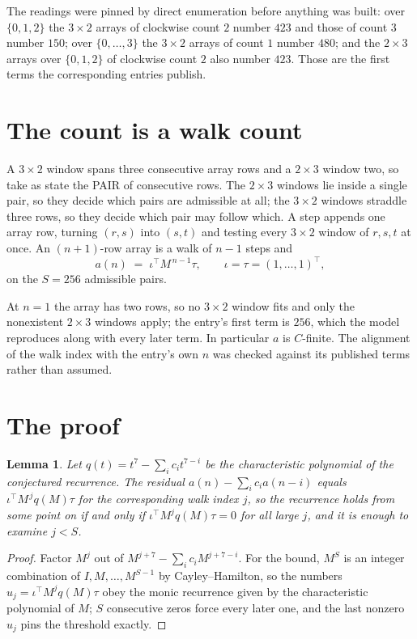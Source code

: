 \documentclass[11pt,a4paper]{article}
\theoremstyle{plain}
\newtheorem{lemma}[theorem]{Lemma}
\theoremstyle{definition}
\begin{document}
The readings were pinned by direct enumeration before anything was built: over
$\{0,1,2\}$ the $3\times2$ arrays of clockwise count $2$ number $423$ and those of count
$3$ number $150$; over $\{0,\dots,3\}$ the $3\times2$ arrays of count $1$ number $480$;
and the $2\times3$ arrays over $\{0,1,2\}$ of clockwise count $2$ also number $423$. Those
are the first terms the corresponding entries publish.

\section{The count is a walk count}

A $3\times2$ window spans three consecutive array rows and a $2\times3$
window two, so take as state the PAIR of consecutive rows. The $2\times3$ windows lie inside a
single pair, so they decide which pairs are admissible at all; the $3\times2$ windows straddle
three rows, so they decide which pair may follow which. A step appends one array row, turning
$(r,s)$ into $(s,t)$ and testing every $3\times2$ window of $r,s,t$ at once. An $(n+1)$-row
array is a walk of $n-1$ steps and
\[
a(n)\;=\;\iota^{\!\top}M^{\,n-1}\tau,\qquad\iota=\tau=(1,\dots,1)^{\!\top},
\]
on the $S=256$ admissible pairs.

At $n=1$ the array has two rows, so no $3\times2$ window fits and only the
nonexistent $2\times3$ windows apply; the entry's first term is
$256$, which the model reproduces along with every later term.
In particular $a$ is $C$-finite. The alignment of the walk index with the entry's own $n$ was
checked against its published terms rather than assumed.

\section{The proof}

\begin{lemma}\label{lem:crit}
Let $q(t)=t^{7}-\sum_i c_it^{7-i}$ be the characteristic polynomial of the
conjectured recurrence. The residual $a(n)-\sum_ic_ia(n-i)$ equals
$\iota^{\!\top}M^{\,j}q(M)\tau$ for the corresponding walk index $j$, so the recurrence
holds from some point on if and only if $\iota^{\!\top}M^{j}q(M)\tau=0$ for all large $j$,
and it is enough to examine $j<S$.
\end{lemma}

\begin{proof}
Factor $M^{j}$ out of $M^{j+7}-\sum_ic_iM^{j+7-i}$. For the bound, $M^{S}$
is an integer combination of $I,M,\dots,M^{S-1}$ by Cayley--Hamilton, so the numbers
$u_j=\iota^{\!\top}M^{j}q(M)\tau$ obey the monic recurrence given by the characteristic
polynomial of $M$; $S$ consecutive zeros force every later one, and the last nonzero $u_j$
pins the threshold exactly.
\end{proof}
\end{document}
